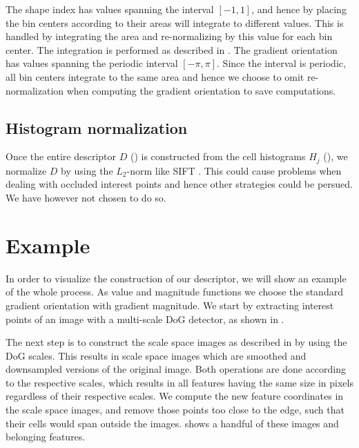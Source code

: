 \documentclass[thesis.tex]{subfiles}
\begin{document}
The shape index has values spanning the interval $[-1,1]$, and hence by placing the bin centers according to  their areas will integrate to different values. This is handled by integrating the area and re-normalizing by this value for each bin center. The integration is performed as described in . The gradient orientation has values spanning the periodic interval $[-\pi,\pi]$. Since the interval is periodic, all bin centers integrate to the same area and hence we choose to omit re-normalization when computing the gradient orientation to save computations.
%
\subsection{Histogram normalization}
Once the entire descriptor $D$ () is constructed from the cell histograms $H_j$ (), we normalize $D$ by using the $L_2$-norm like SIFT \cite{lowe2004distinctive}. This could cause problems when dealing with occluded interest points and hence other strategies could be persued. We have however not chosen to do so.

%
\section{Example}
%
In order to visualize the construction of our descriptor, we will show an example of the whole process. As value and magnitude functions we choose the standard gradient orientation with gradient magnitude. We start by extracting interest points of an image with a multi-scale DoG detector, as shown in .


The next step is to construct the scale space images as described in  by using the DoG scales. This results in scale space images which are smoothed and downsampled versions of the original image. Both operations are done according to the respective scales, which results in all features having the same size in pixels regardless of their respective scales. We compute the new feature coordinates in the scale space images, and remove those points too close to the edge, such that their cells would span outside the images.  shows a handful of these images and belonging features.
\end{document}

